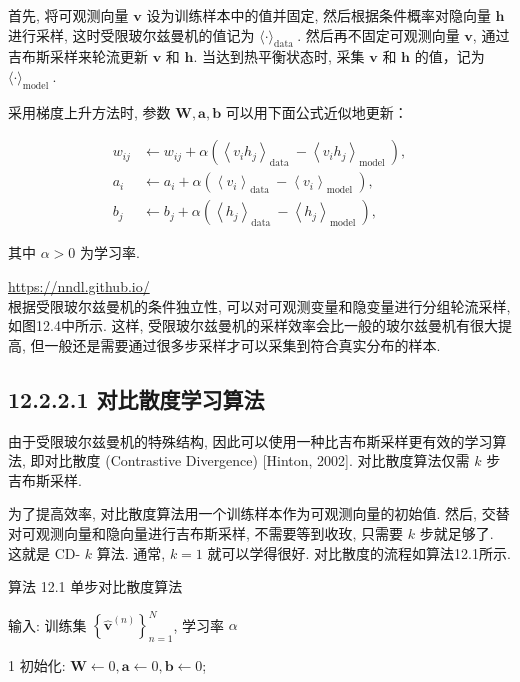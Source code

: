 \documentclass[10pt]{article}
\begin{document}
首先, 将可观测向量 $\boldsymbol{v}$ 设为训练样本中的值并固定, 然后根据条件概率对隐向量 $\boldsymbol{h}$ 进行采样, 这时受限玻尔兹曼机的值记为 $\langle\cdot\rangle_{\text {data }}$. 然后再不固定可观测向量 $\boldsymbol{v}$, 通过吉布斯采样来轮流更新 $\boldsymbol{v}$ 和 $\boldsymbol{h}$. 当达到热平衡状态时, 采集 $\boldsymbol{v}$ 和 $\boldsymbol{h}$ 的值，记为 $\langle\cdot\rangle_{\text {model }}$.

采用梯度上升方法时, 参数 $\boldsymbol{W}, \boldsymbol{a}, \boldsymbol{b}$ 可以用下面公式近似地更新：


\begin{align*}
w_{i j} & \leftarrow w_{i j}+\alpha\left(\left\langle v_{i} h_{j}\right\rangle_{\text {data }}-\left\langle v_{i} h_{j}\right\rangle_{\text {model }}\right),  \tag{12.54}\\
a_{i} & \leftarrow a_{i}+\alpha\left(\left\langle v_{i}\right\rangle_{\text {data }}-\left\langle v_{i}\right\rangle_{\text {model }}\right),  \tag{12.55}\\
b_{j} & \leftarrow b_{j}+\alpha\left(\left\langle h_{j}\right\rangle_{\text {data }}-\left\langle h_{j}\right\rangle_{\text {model }}\right), \tag{12.56}
\end{align*}


其中 $\alpha>0$ 为学习率.

\href{https://nndl.github.io/}{https://nndl.github.io/}\\
根据受限玻尔兹曼机的条件独立性, 可以对可观测变量和隐变量进行分组轮流采样, 如图12.4中所示. 这样, 受限玻尔兹曼机的采样效率会比一般的玻尔兹曼机有很大提高, 但一般还是需要通过很多步采样才可以采集到符合真实分布的样本.

\subsection*{12.2.2.1 对比散度学习算法}
由于受限玻尔兹曼机的特殊结构, 因此可以使用一种比吉布斯采样更有效的学习算法, 即对比散度 (Contrastive Divergence) [Hinton, 2002]. 对比散度算法仅需 $k$ 步吉布斯采样.

为了提高效率, 对比散度算法用一个训练样本作为可观测向量的初始值. 然后, 交替对可观测向量和隐向量进行吉布斯采样, 不需要等到收玫, 只需要 $k$ 步就足够了. 这就是 CD- $k$ 算法. 通常, $k=1$ 就可以学得很好. 对比散度的流程如算法12.1所示.

算法 12.1 单步对比散度算法

输入: 训练集 $\left\{\hat{\boldsymbol{v}}^{(n)}\right\}_{n=1}^{N}$, 学习率 $\alpha$

1 初始化: $\boldsymbol{W} \leftarrow 0, \boldsymbol{a} \leftarrow 0, \boldsymbol{b} \leftarrow 0$;
\end{document}
